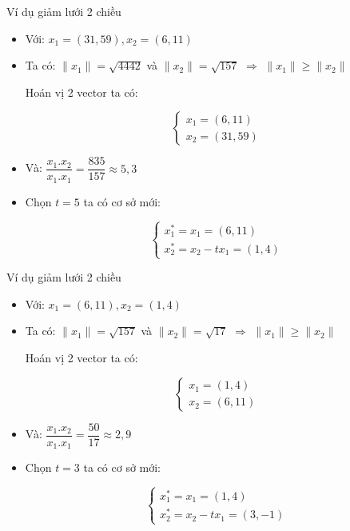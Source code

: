 \documentclass{beamer}
\numberwithin{equation}{section}
\begin{document}
\begin{frame}{Ví dụ giảm lưới 2 chiều}
\begin{itemize}
\item Với: $x_1 = (31, 59), x_2 = (6, 11)$
\item Ta có: $\|x_1\|= \sqrt{4442}$ và $\|x_2\| = \sqrt{157}$ $\Rightarrow$ $\|x_1\| \geq \|x_2\|$

Hoán vị 2 vector ta có:

$$\begin{cases}
x_1 = (6, 11)\\
x_2 = (31, 59)
\end{cases}$$

\item Và: $\dfrac{x_1.x_2}{x_1.x_1} = \dfrac{835}{157} \approx 5, 3$

\item Chọn $t = 5$ ta có cơ sở mới:

$$\begin{cases}
x_1^{*} = x_1 = (6, 11) \\
x_2^{*} = x_2 - t x_1 = (1, 4)
\end{cases}$$

\end{itemize}

\end{frame}
\begin{frame}{Ví dụ giảm lưới 2 chiều}
\begin{itemize}

\item Với: $x_1 = (6, 11), x_2 = (1, 4)$
\item Ta có: $\|x_1\|= \sqrt{157}$ và $\|x_2\| = \sqrt{17}$ $\Rightarrow$ $\|x_1\| \geq \|x_2\|$

Hoán vị 2 vector ta có:

$$\begin{cases}
x_1 = (1, 4)\\
x_2 =(6, 11)
\end{cases}$$

\item Và: $\dfrac{x_1.x_2}{x_1.x_1} = \dfrac{50}{17} \approx 2, 9$

\item Chọn $t = 3$ ta có cơ sở mới:

$$\begin{cases}
x_1^{*} = x_1 = (1, 4)\\
x_2^{*} = x_2 - t x_1 = (3, -1)
\end{cases}$$

\end{itemize}
\end{frame}
\end{document}
